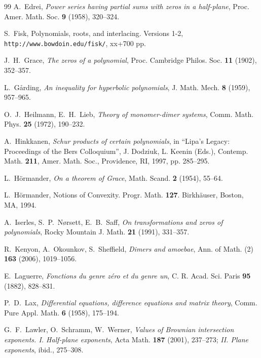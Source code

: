 \documentclass[10pt,reqno]{amsart}
\theoremstyle{plain}
\theoremstyle{definition}
\theoremstyle{remark}
\numberwithin{equation}{section}
\begin{document}
\begin{thebibliography}{99}
A.~Edrei, {\em Power series having partial sums with zeros in a half-plane}, 
Proc. Amer. Math. Soc. {\bf 9} (1958), 320--324. 


S.~Fisk, Polynomials, roots, and interlacing. Versions 1-2, 
\texttt{http://www.bowdoin.edu/fisk/}, xx+700 pp. 

J.~H.~Grace, {\em The zeros of a polynomial}, Proc. Cambridge Philos. Soc. 
{\bf 11} (1902), 352--357.

L.~G\aa rding, {\em An inequality for hyperbolic polynomials}, 
J. Math. Mech. {\bf 8} (1959), 957--965. 

O.~J.~Heilmann, E.~H.~Lieb, {\em Theory of monomer-dimer systems},
Comm. Math. Phys. {\bf 25} (1972), 190--232.


A.~Hinkkanen, {\em Schur products of certain polynomials}, in 
``Lipa's Legacy: Proceedings of the Bers Colloquium'', J. Dodziuk, L. Keenin 
(Eds.), Contemp. Math. {\bf 211}, Amer. Math. Soc., Providence, RI, 1997, 
pp. 285--295.

L.~H\"ormander, {\em On a theorem of Grace}, Math. Scand. {\bf 2} (1954), 
55--64.

L.~H\"ormander, Notions of Convexity. Progr. Math. {\bf 127}. 
Birkh\"auser, Boston, MA, 1994.

A.~Iserles, S.~P.~N\o rsett, E.~B.~Saff, {\em On 
transformations and zeros of polynomials}, Rocky Mountain J. Math. 
{\bf 21} (1991), 331--357.

R.~Kenyon, A.~Okounkov, S.~Sheffield, {\em Dimers and amoebae}, 
Ann. of Math. (2) {\bf 163} (2006), 1019--1056.

E.~Laguerre, {\em Fonctions du genre z\'ero et du genre un}, C. R. Acad. Sci.
Paris {\bf 95} (1882), 828--831.

P.~D.~Lax, {\em Differential equations, difference equations and matrix 
theory}, Comm. Pure Appl. Math. {\bf 6} (1958), 175--194.

G.~F.~Lawler, O.~Schramm, W.~Werner, {\em Values of Brownian intersection 
exponents. I. Half-plane exponents}, Acta Math. {\bf 187} (2001), 237--273;
{\em II. Plane exponents}, ibid., 275--308.  


\end{thebibliography}
\end{document}
